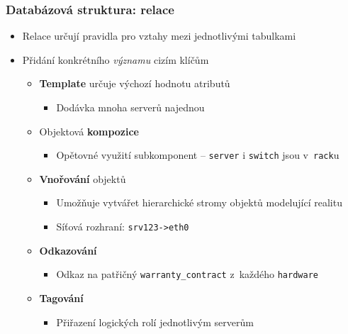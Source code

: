\documentclass{beamer}
\begin{document}
\begin{frame}[fragile]
\frametitle{Databázová struktura: relace}
\begin{itemize}
    \item Relace určují pravidla pro vztahy mezi jednotlivými tabulkami
    \item Přidání konkrétního {\em významu} cizím klíčům
        \begin{itemize}
            \item {\bf Template} určuje výchozí hodnotu atributů
                \begin{itemize}
                    \item Dodávka mnoha serverů najednou
                \end{itemize}
            \item Objektová {\bf kompozice}
                \begin{itemize}
                    \item Opětovné využití subkomponent -- {\tt server} i {\tt switch} jsou v~{\tt rack}u
                \end{itemize}
            \item {\bf Vnořování} objektů
                \begin{itemize}
                    \item Umožňuje vytvářet hierarchické stromy objektů modelující realitu
                    \item Síťová rozhraní: {\tt srv123->eth0}
                \end{itemize}
            \item {\bf Odkazování}
                \begin{itemize}
                    \item Odkaz na patřičný {\tt warranty\_contract} z~každého {\tt hardware}
                \end{itemize}
            \item {\bf Tagování}
                \begin{itemize}
                    \item Přiřazení logických rolí jednotlivým serverům
                \end{itemize}
        \end{itemize}
\end{itemize}
\end{frame}
\end{document}

